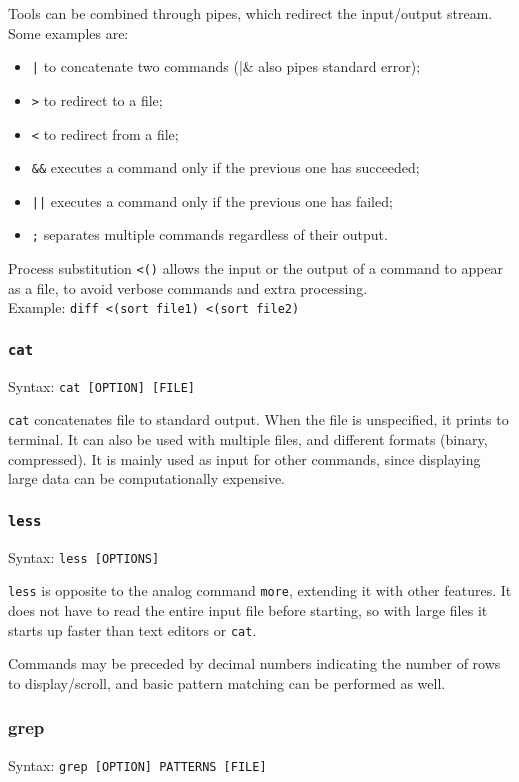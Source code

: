 Tools can be combined through pipes, which redirect the input/output stream. Some examples are:
\begin{itemize}
	\item \texttt{|} to concatenate two commands (|\& also pipes standard error);
	\item \texttt{>} to redirect to a file;
	\item \texttt{<} to redirect from a file;
	\item \texttt{\&\&} executes a command only if the previous one has succeeded;
	\item \texttt{||} executes a command only if the previous one has failed;
	\item \texttt{;} separates multiple commands regardless of their output.
\end{itemize}

Process substitution \texttt{<()} allows the input or the output of a command to appear as a file, to avoid verbose commands and extra processing. \\
Example: \texttt{diff <(sort file1) <(sort file2)}

\subsubsection{\texttt{cat}}
Syntax: \texttt{cat [OPTION] [FILE]}

\texttt{cat} concatenates file to standard output. When the file is unspecified, it prints to terminal. It can also be used with multiple files, and different formats (binary, compressed). It is mainly used as input for other commands, since displaying large data can be computationally expensive.

\subsubsection{\texttt{less}}
Syntax: \texttt{less [OPTIONS]}

\texttt{less} is opposite to the analog command \texttt{more}, extending it with other features. It does not have to read the entire input file before starting, so with large files it starts up faster than text editors or \texttt{cat}. 

Commands may be preceded by decimal numbers indicating the number of rows to display/scroll, and basic pattern matching can be performed as well. 

\subsubsection{grep}
Syntax: \texttt{grep [OPTION] PATTERNS [FILE]}

